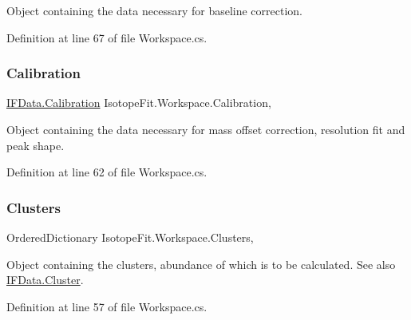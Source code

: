 Object containing the data necessary for baseline correction. 



Definition at line 67 of file Workspace.\+cs.

\mbox{\label{class_isotope_fit_1_1_workspace_a0ed1cfd6701db24de84f4ba67eed0442}} 
\subsubsection{\texorpdfstring{Calibration}{Calibration}}
{\footnotesize\ttfamily \mbox{\hyperlink{class_isotope_fit_1_1_i_f_data_1_1_calibration}{I\+F\+Data.\+Calibration}} Isotope\+Fit.\+Workspace.\+Calibration\hspace{0.3cm}{\ttfamily [get]}, {\ttfamily [set]}}



Object containing the data necessary for mass offset correction, resolution fit and peak shape. 



Definition at line 62 of file Workspace.\+cs.

\mbox{\label{class_isotope_fit_1_1_workspace_a13958fbe0adace21990cb1eabbd421e9}} 
\subsubsection{\texorpdfstring{Clusters}{Clusters}}
{\footnotesize\ttfamily Ordered\+Dictionary Isotope\+Fit.\+Workspace.\+Clusters\hspace{0.3cm}{\ttfamily [get]}, {\ttfamily [set]}}



Object containing the clusters, abundance of which is to be calculated. See also \mbox{\hyperlink{class_isotope_fit_1_1_i_f_data_1_1_cluster}{I\+F\+Data.\+Cluster}}. 



Definition at line 57 of file Workspace.\+cs.

\mbox{\label{class_isotope_fit_1_1_workspace_ae24a2ee8f965fb2ed7ad3a592163271d}} 
